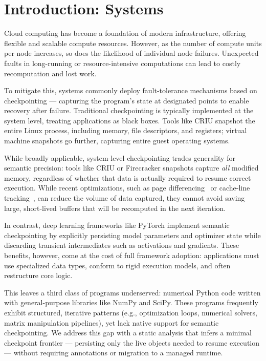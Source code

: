 

\section{Introduction: Systems}
Cloud computing has become a foundation of modern infrastructure, offering flexible and scalable compute resources. However, as the number of compute units per node increases, so does the likelihood of individual node failures. Unexpected faults in long-running or resource-intensive computations can lead to costly recomputation and lost work.

To mitigate this, systems commonly deploy fault-tolerance mechanisms based on checkpointing --- capturing the program’s state at designated points to enable recovery after failure. Traditional checkpointing is typically implemented at the system level, treating applications as black boxes. Tools like CRIU snapshot the entire Linux process, including memory, file descriptors, and registers; virtual machine snapshots go further, capturing entire guest operating systems.

While broadly applicable, system-level checkpointing trades generality for semantic precision: tools like CRIU or Firecracker snapshots capture \emph{all} modified memory, regardless of whether that data is actually required to resume correct execution. While recent optimizations, such as page differencing~\cite{} or cache-line tracking~\cite{}, can reduce the volume of data captured, they cannot avoid saving large, short-lived buffers that will be recomputed in the next iteration.

In contrast, deep learning frameworks like PyTorch implement semantic checkpointing by explicitly persisting model parameters and optimizer state while discarding transient intermediates such as activations and gradients. These benefits, however, come at the cost of full framework adoption: applications must use specialized data types, conform to rigid execution models, and often restructure core logic.

This leaves a third class of programs underserved: numerical Python code written with general-purpose libraries like NumPy and SciPy. These programs frequently exhibit structured, iterative patterns (e.g., optimization loops, numerical solvers, matrix manipulation pipelines), yet lack native support for semantic checkpointing. We address this gap with a static analysis that infers a minimal checkpoint frontier --- persisting only the live objects needed to resume execution --- without requiring annotations or migration to a managed runtime.

